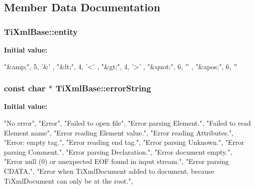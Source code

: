 \subsection{\-Member \-Data \-Documentation}
\hypertarget{class_ti_xml_base_aae956c75fedff20d337f7cc109c6b71a}{
\subsubsection[{entity}]{ \-Ti\-Xml\-Base\-::entity}}\label{class_ti_xml_base_aae956c75fedff20d337f7cc109c6b71a}
{\bfseries \-Initial value\-:}
\begin{DoxyCode}
 
{
        { "&amp;",  5, '&' },
        { "&lt;",   4, '<' },
        { "&gt;",   4, '>' },
        { "&quot;", 6, '\"' },
        { "&apos;", 6, '\'' }
}
\end{DoxyCode}
\hypertarget{class_ti_xml_base_a7ac8feec4100e446b3d78e1ac0659700}{
\subsubsection[{error\-String}]{\setlength{\rightskip}{0pt plus 5cm}const char $\ast$ \-Ti\-Xml\-Base\-::error\-String}}\label{class_ti_xml_base_a7ac8feec4100e446b3d78e1ac0659700}
{\bfseries \-Initial value\-:}
\begin{DoxyCode}

{
        "No error",
        "Error",
        "Failed to open file",
        "Error parsing Element.",
        "Failed to read Element name",
        "Error reading Element value.",
        "Error reading Attributes.",
        "Error: empty tag.",
        "Error reading end tag.",
        "Error parsing Unknown.",
        "Error parsing Comment.",
        "Error parsing Declaration.",
        "Error document empty.",
        "Error null (0) or unexpected EOF found in input stream.",
        "Error parsing CDATA.",
        "Error when TiXmlDocument added to document, because TiXmlDocument can
       only be at the root.",
}
\end{DoxyCode}
